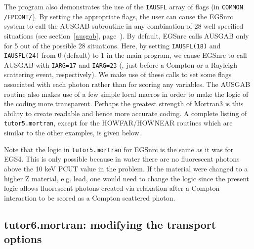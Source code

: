 The program also demonstrates the use of the {\tt IAUSFL} array of
flags (in {\tt COMMON /EPCONT/}).  By setting the appropriate flags,
the user can cause the EGSnrc system to call the AUSGAB subroutine in
any combination of 28 well specified situations (see section~\ref{ausgab},
page~\pageref{ausgab}).
By default, EGSnrc calls AUSGAB only for 5 out of the
possible 28 situations.  Here, by setting {\tt IAUSFL(18)} and
{\tt IAUSFL(24)} from 0 (default) to 1 in the main program, we cause EGSnrc
to call AUSGAB with {\tt IARG=17} and {\tt IARG=23} (\ie, just before a
Compton or a Rayleigh scattering event, respectively).  We make use of
these calls to set some flags associated with each photon rather than
for scoring any variables.  The AUSGAB routine also makes use of a few
simple local macros in order to make the logic of the coding more
transparent.  Perhaps the greatest strength of Mortran3 is this
ability to create readable and hence more accurate coding.
A complete listing of {\tt tutor5.mortran}, except for the HOWFAR/HOWNEAR
routines
which are similar to the other examples, is given below.
 

Note that the logic in {\tt tutor5.mortran} for EGSnrc
is the same as it was for EGS4.  This is only possible because in water
there are no fluorescent photons above the 10 keV PCUT value in the
problem.  If the material were changed to a higher Z material, e.g. lead,
one would need to change the logic since the present logic allows
fluorescent photons created via relaxation after a Compton interaction to
be scored as a Compton scattered photon.

\begin{latexonly}
%


\clearpage
\end{latexonly}

\begin{htmlonly}
\clearpage

\clearpage

\clearpage
\end{htmlonly}


\subsection{tutor6.mortran: modifying the transport options}
\label{tutor6}

